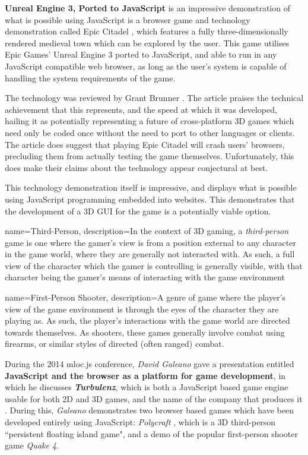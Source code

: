 \textbf{Unreal Engine 3, Ported to JavaScript} is an impressive demonstration of what is possible using JavaScript is a browser game and technology demonstration called Epic Citadel \cite{EpicCitadel}, which features a fully three-dimensionally rendered medieval town which can be explored by the user. This game utilises Epic Games' Unreal Engine 3 ported to JavaScript, and able to run in any JavaScript compatible web browser, as long as the user's system is capable of handling the system requirements of the game.

The technology was reviewed by Grant Brunner \cite{Unreal3JavaScriptExtremeTech}. The article praises the technical achievement that this represents, and the speed at which it was developed, hailing it as potentially representing a future of cross-platform 3D games which need only be coded once without the need to port to other languages or clients.
The article does suggest that playing Epic Citadel will crash users' browsers, precluding them from actually testing the game themselves. Unfortunately, this does make their claims about the technology appear conjectural at best.

This technology demonstration itself is impressive, and displays what is possible using JavaScript programming embedded into websites. This demonstrates that the development of a 3D GUI for the game is a potentially viable option.

{
	name=Third-Person,
	description={In the context of 3D gaming, a \emph{third-person} game is one where the gamer's view is from a position external to any character in the game world, where they are generally not interacted with. As such, a full view of the character which the gamer is controlling is generally visible, with that character being the gamer's means of interacting with the game environment}
}

{
	name=First-Person Shooter,
	description={A genre of game where the player's view of the game environment is through the eyes of the character they are playing as. As such, the player's interactions with the game world are directed towards themselves. As shooters, these games generally involve combat using firearms, or similar styles of directed (often ranged) combat.}
}

During the 2014 mloc.js conference, \emph{David Galeano} gave a presentation entitled \textbf{JavaScript and the browser as a platform for game development}, in which he discusses \textbf{\emph{Turbulenz}}, which is both a JavaScript based game engine usable for both 2D and 3D games, and the name of the company that produces it \cite{GaleanoJavaScriptForGameDevelopment}. During this, \emph{Galeano} demonstrates two browser based games which have been developed entirely using JavaScript: \emph{Polycraft} \cite{Polycraft}, which is a 3D \gls{third-person} ``persistent floating island game", and a demo of the popular \gls{first-person shooter} game \emph{Quake 4}.

